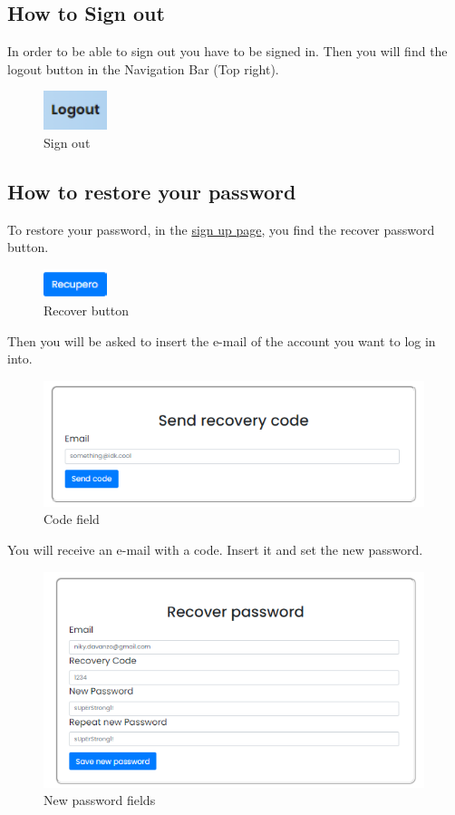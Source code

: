 \subsection{How to Sign out} \label{_signout}
In order to be able to sign out you have to be signed in. Then you will find the logout button in the Navigation Bar (Top right).

\begin{figure}[H]
    \centering
    \includegraphics[width=5em]{res/images/cliente/signout.png}
    \caption{Sign out}
\end{figure}

\subsection{How to restore your password} \label{_passwordrecover}
To restore your password, in the \hyperref[_signup]{sign up page}, you find the recover password button.
\begin{figure}[H]
    \centering
    \includegraphics[width=5em]{res/images/cliente/recover.png}
    \caption{Recover button}
\end{figure}

Then you will be asked to insert the e-mail of the account you want to log in into.
\begin{figure}[H]
    \centering
    \includegraphics[width=30em]{res/images/cliente/recoveremail.png}
    \caption{Code field}
\end{figure}

You will receive an e-mail with a code. Insert it and set the new password.
\begin{figure}[H]
    \centering
    \includegraphics[width=30em]{res/images/cliente/newpassword.png}
    \caption{New password fields}
\end{figure}


